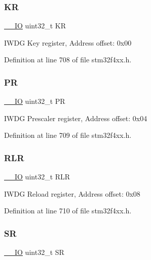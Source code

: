 \subsubsection{\texorpdfstring{KR}{KR}}
{\footnotesize\ttfamily \hyperlink{group___c_m_s_i_s__core__definitions_gaec43007d9998a0a0e01faede4133d6be}{\+\_\+\+\_\+\+IO} uint32\+\_\+t KR}

I\+W\+DG Key register, Address offset\+: 0x00 

Definition at line 708 of file stm32f4xx.\+h.

\mbox{\label{struct_i_w_d_g___type_def_af8d25514079514d38c104402f46470af}} 
\subsubsection{\texorpdfstring{PR}{PR}}
{\footnotesize\ttfamily \hyperlink{group___c_m_s_i_s__core__definitions_gaec43007d9998a0a0e01faede4133d6be}{\+\_\+\+\_\+\+IO} uint32\+\_\+t PR}

I\+W\+DG Prescaler register, Address offset\+: 0x04 

Definition at line 709 of file stm32f4xx.\+h.

\mbox{\label{struct_i_w_d_g___type_def_a7015e1046dbd3ea8783b33dc11a69e52}} 
\subsubsection{\texorpdfstring{R\+LR}{RLR}}
{\footnotesize\ttfamily \hyperlink{group___c_m_s_i_s__core__definitions_gaec43007d9998a0a0e01faede4133d6be}{\+\_\+\+\_\+\+IO} uint32\+\_\+t R\+LR}

I\+W\+DG Reload register, Address offset\+: 0x08 

Definition at line 710 of file stm32f4xx.\+h.

\mbox{\label{struct_i_w_d_g___type_def_af6aca2bbd40c0fb6df7c3aebe224a360}} 
\subsubsection{\texorpdfstring{SR}{SR}}
{\footnotesize\ttfamily \hyperlink{group___c_m_s_i_s__core__definitions_gaec43007d9998a0a0e01faede4133d6be}{\+\_\+\+\_\+\+IO} uint32\+\_\+t SR}

